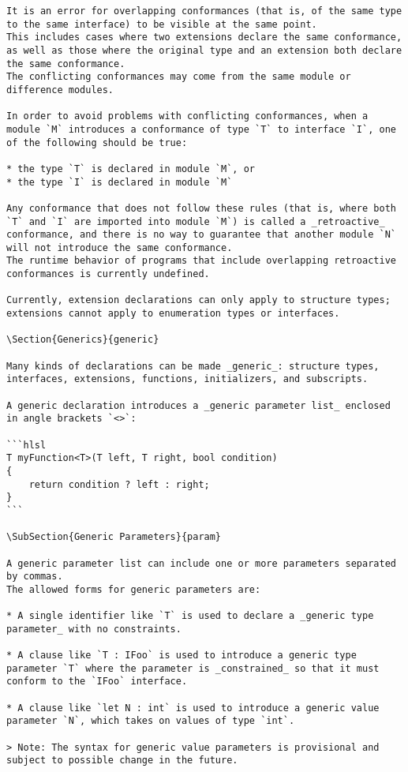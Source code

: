 \begin{verbatim}
It is an error for overlapping conformances (that is, of the same type to the same interface) to be visible at the same point.
This includes cases where two extensions declare the same conformance, as well as those where the original type and an extension both declare the same conformance.
The conflicting conformances may come from the same module or difference modules.

In order to avoid problems with conflicting conformances, when a module `M` introduces a conformance of type `T` to interface `I`, one of the following should be true:

* the type `T` is declared in module `M`, or
* the type `I` is declared in module `M`

Any conformance that does not follow these rules (that is, where both `T` and `I` are imported into module `M`) is called a _retroactive_ conformance, and there is no way to guarantee that another module `N` will not introduce the same conformance.
The runtime behavior of programs that include overlapping retroactive conformances is currently undefined.

Currently, extension declarations can only apply to structure types; extensions cannot apply to enumeration types or interfaces.

\Section{Generics}{generic}

Many kinds of declarations can be made _generic_: structure types, interfaces, extensions, functions, initializers, and subscripts.

A generic declaration introduces a _generic parameter list_ enclosed in angle brackets `<>`:

```hlsl
T myFunction<T>(T left, T right, bool condition)
{
    return condition ? left : right;
}
```

\SubSection{Generic Parameters}{param}

A generic parameter list can include one or more parameters separated by commas.
The allowed forms for generic parameters are:

* A single identifier like `T` is used to declare a _generic type parameter_ with no constraints.

* A clause like `T : IFoo` is used to introduce a generic type parameter `T` where the parameter is _constrained_ so that it must conform to the `IFoo` interface.

* A clause like `let N : int` is used to introduce a generic value parameter `N`, which takes on values of type `int`.

> Note: The syntax for generic value parameters is provisional and subject to possible change in the future.


\end{verbatim}
